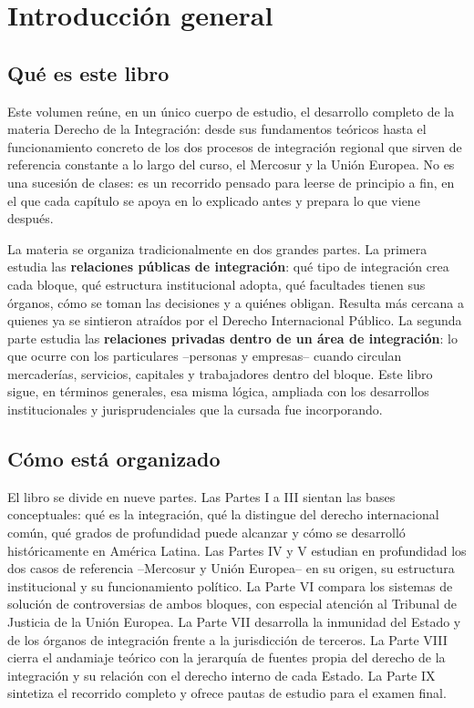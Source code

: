 \documentclass[12pt,oneside]{book}
\newcommand{\materia}{Derecho de la Integración}
\begin{document}
\chapter*{Introducción general}

\section*{Qué es este libro}

Este volumen reúne, en un único cuerpo de estudio, el desarrollo completo de la materia \materia{}: desde sus fundamentos teóricos hasta el funcionamiento concreto de los dos procesos de integración regional que sirven de referencia constante a lo largo del curso, el Mercosur y la Unión Europea. No es una sucesión de clases: es un recorrido pensado para leerse de principio a fin, en el que cada capítulo se apoya en lo explicado antes y prepara lo que viene después.

La materia se organiza tradicionalmente en dos grandes partes. La primera estudia las \textbf{relaciones públicas de integración}: qué tipo de integración crea cada bloque, qué estructura institucional adopta, qué facultades tienen sus órganos, cómo se toman las decisiones y a quiénes obligan. Resulta más cercana a quienes ya se sintieron atraídos por el Derecho Internacional Público. La segunda parte estudia las \textbf{relaciones privadas dentro de un área de integración}: lo que ocurre con los particulares --personas y empresas-- cuando circulan mercaderías, servicios, capitales y trabajadores dentro del bloque. Este libro sigue, en términos generales, esa misma lógica, ampliada con los desarrollos institucionales y jurisprudenciales que la cursada fue incorporando.

\section*{Cómo está organizado}

El libro se divide en nueve partes. Las Partes I a III sientan las bases conceptuales: qué es la integración, qué la distingue del derecho internacional común, qué grados de profundidad puede alcanzar y cómo se desarrolló históricamente en América Latina. Las Partes IV y V estudian en profundidad los dos casos de referencia --Mercosur y Unión Europea-- en su origen, su estructura institucional y su funcionamiento político. La Parte VI compara los sistemas de solución de controversias de ambos bloques, con especial atención al Tribunal de Justicia de la Unión Europea. La Parte VII desarrolla la inmunidad del Estado y de los órganos de integración frente a la jurisdicción de terceros. La Parte VIII cierra el andamiaje teórico con la jerarquía de fuentes propia del derecho de la integración y su relación con el derecho interno de cada Estado. La Parte IX sintetiza el recorrido completo y ofrece pautas de estudio para el examen final.
\end{document}
